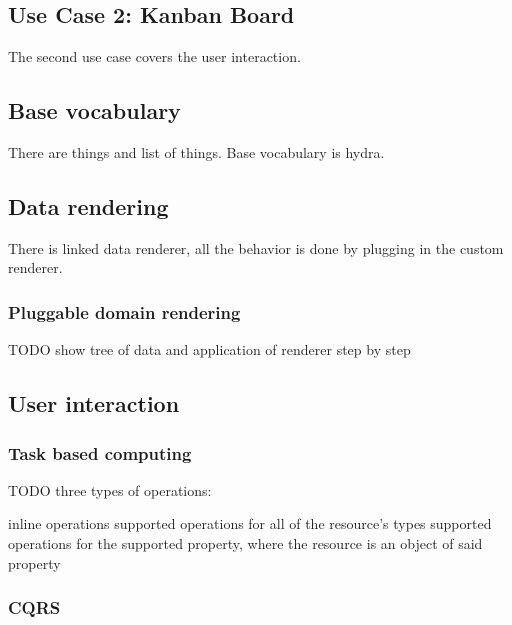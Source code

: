 \subsection{Use Case 2: Kanban Board}\label{usecases}
The second use case covers the user interaction.

\subsection{Base vocabulary}\label{basevocab}
There are things and list of things. Base vocabulary is hydra.

\subsection{Data rendering}\label{genericrendering}
There is linked data renderer, all the behavior is done by plugging in the custom renderer.

\subsubsection{Pluggable domain rendering}\label{domainrendering}
TODO show tree of data and application of renderer step by step

\subsection{User interaction}\label{interaction}

\subsubsection{Task based computing}\label{interaction}
TODO three types of operations:

inline operations
supported operations for all of the resource's types
supported operations for the supported property, where the resource is an object of said property

\subsubsection{CQRS}\label{interaction}
